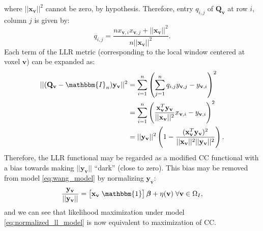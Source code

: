 where $||\mathbf{x}_{\mathbf{v}}||^{2}$ cannot be zero, by hypothesis. Therefore, entry $q_{i,j}$ of $\mathbf{Q}_{\mathbf{v}}$ at row $i$, column $j$ is given by:
\vspace{-0.3cm}
\begin{displaymath}
    q_{i,j} = \frac{nx_{\mathbf{v},i}x_{\mathbf{v}, j} + ||\mathbf{x}_{\mathbf{v}}||^{2}}{n||\mathbf{x}_{\mathbf{v}}||^{2}}.
\end{displaymath}
Each term of the LLR metric (corresponding to the local window centered at voxel $\mathbf{v}$) can be expanded as:
\begin{equation}\label{eq:llr_cc_relationship}
    \begin{split}
        ||(\mathbf{Q}_{\mathbf{v}} - \mathbbm{I}_{n})\mathbf{y}_{\mathbf{v}}||^{2} &= \sum_{i=1}^{n} \left(\sum_{j=1}^{n} q_{i,j} y_{\mathbf{v}, j} - y_{\mathbf{v},i}\right)^{2}\\
        &=\sum_{i=1}^{n}\left(\frac{\mathbf{x}_{\mathbf{v}}^{T}\mathbf{y}_{\mathbf{v}}}{||\mathbf{x}_{\mathbf{v}}||^{2}} x_{\mathbf{v}, i} - y_{\mathbf{v},i}\right)^{2} \\
        &= ||\mathbf{y}_{\mathbf{v}}||^{2}\left(1 - \frac{(\mathbf{x}_{\mathbf{v}}^{T}\mathbf{y}_{\mathbf{v}})^{2}}{||\mathbf{x}_{\mathbf{v}}||^{2}||\mathbf{y}_{\mathbf{v}}||^{2}}\right).
    \end{split}
\end{equation}
Therefore, the LLR functional may be regarded as a modified CC functional with a bias towards making $||\mathbf{y}_{\mathbf{v}}||$ ``dark'' (close to zero). This bias may be removed from model \eqref{eq:wang_model} by normalizing $\mathbf{y}_{\mathbf{v}}$:\\
\begin{equation}\label{eq:normalized_ll_model}
    \frac{\mathbf{y}_{\mathbf{v}}}{||\mathbf{y}_{\mathbf{v}}||} = \left[\mathbf{x}_{\mathbf{v}} \; \mathbbm{1}\right]\boldsymbol{\beta} + \eta(\mathbf{v}) \; \forall \mathbf{v}\in\Omega_{I},
\end{equation}
and we can see that likelihood maximization under model \eqref{eq:normalized_ll_model} is now equivalent to maximization of CC.\\

